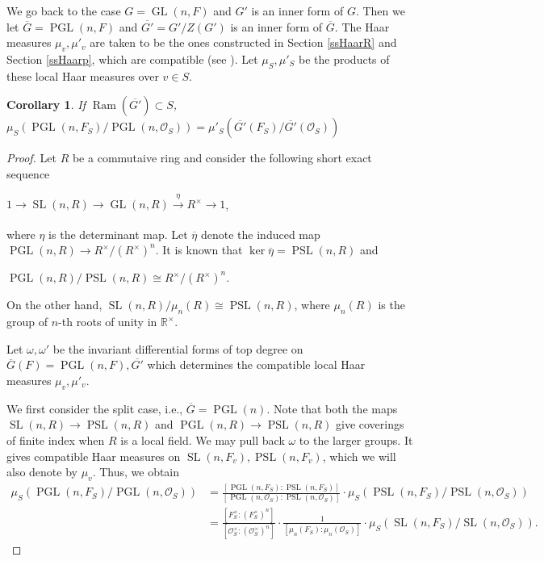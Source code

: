 \documentclass[11pt]{article}
\theoremstyle{plain}
\newtheorem{corollary}[theorem]{Corollary}
\theoremstyle{remark}
\theoremstyle{definition}
\DeclareMathOperator{\SL}{SL}
\DeclareMathOperator{\GL}{GL}
\DeclareMathOperator{\PGL}{PGL}
\DeclareMathOperator{\PSL}{PSL}
\DeclareMathOperator{\ram}{Ram}
\begin{document}
We go back to the case $G=\GL(n,F)$ and $G'$ is an inner form of $G$. 
Then we let $\overline{G}=\PGL(n,F)$ and $\overline{G'}=G'/Z(G')$ is an inner form of $\overline{G}$. 
The Haar measures $\mu_v,\mu'_v$ are taken to be the ones constructed in Section \ref{ssHaarR} and Section \ref{ssHaarp}, which are compatible (see \cite[\S 29]{Voight21}). 
Let $\mu_S,\mu'_S$ be the products of these local Haar measures over $v\in S$. 
\begin{corollary}\label{cPGLhaar=}
If $\ram(\overline{G'})\subset S$, 
$\mu_{S}(\PGL(n,F_S)/ \PGL(n,\mathcal{O}_S))=\mu'_{S}(\overline{G'}(F_S)/ \overline{G'}(\mathcal{O}_S))$
\end{corollary}
\begin{proof}
Let $R$ be a commutaive ring and consider the following short exact sequence
\begin{center}
    $1\xrightarrow[]{} \SL(n,R)\xrightarrow[]{}\GL(n,R)\xrightarrow[]{\eta}  R^{\times}\to 1$,
\end{center}
where $\eta$ is the determinant map. 
Let $\overline{\eta}$ denote the induced map $\PGL(n,R)\to R^{\times}/(R^{\times})^{n}$. 
It is known that $\ker \overline{\eta}=\PSL(n,R)$ and
\begin{center}
    $\PGL(n,R)/\PSL(n,R)\cong R^{\times}/(R^{\times})^{n}$. 
\end{center}
On the other hand, $\SL(n,R)/\mu_n(R)\cong \PSL(n,R)$, where $\mu_{n}(R)$ is the group of $n$-th roots of unity in $\mathbb{R}^{\times}$.

Let $\omega,\omega'$ be the invariant differential forms of top degree on $\overline{G}(F)=\PGL(n,F),\overline{G'}$ which determines the compatible local Haar measures $\mu_v,\mu'_{v}$. 

We first consider the split case, i.e., $\overline{G}=\PGL(n)$. 
Note that both the maps $\SL(n,R)\to \PSL(n,R)$ and $\PGL(n,R)\to \PSL(n,R)$ give coverings of finite index when $R$ is a local field. 
We may pull back $\omega$ to the larger groups. It gives compatible Haar measures on $\SL(n,F_v),\PSL(n,F_v)$, which we will also denote by $\mu_{v}$.
Thus, we obtain
\begin{equation}\label{ePGL-SL}
\begin{aligned}
    \mu_{S}(\PGL(n,F_S)/\PGL(n,\mathcal{O}_S))&=\frac{[\PGL(n,F_S):\PSL(n,F_S)]}{[\PGL(n,\mathcal{O}_S):\PSL(n,\mathcal{O}_S)]}\cdot \mu_{S}(\PSL(n,F_S)/\PSL(n,\mathcal{O}_S))\\
    &=\frac{[F_S^{\times}:(F_S^{\times})^n]}{[\mathcal{O}_S^{\times}:(\mathcal{O}_S^{\times})^n]}\cdot \frac{1}{[\mu_n(F_S):\mu_n(\mathcal{O}_S)]}\cdot \mu_{S}(\SL(n,F_S)/\SL(n,\mathcal{O}_S)). 
\end{aligned}
\end{equation}


\end{proof}
\end{document}
